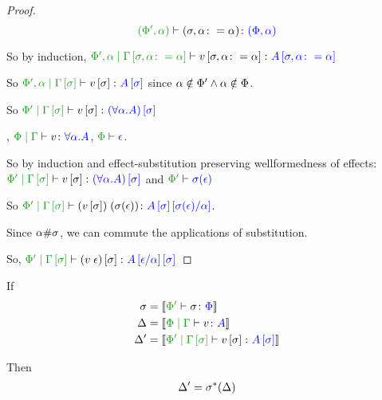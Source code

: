 \documentclass{report}
\begin{document}
\begin{framed}
\begin{proof}
    $$\typerelation{(\P',\a)}{(\si, \a\setto\a)}{(\P,\a)}$$
    
    So by induction, $\etyperelation{\P', \a}{\G\sub{\si, \a\setto\a}}{v\sub{\si,\a\setto\a}}{A\sub{\si, \a\setto\a}}$
    
    So $\etyperelation{\P',\a}{\G\ssi}{v\ssi}{A\ssi}$ since $\alpha\notin\Phi' \wedge\alpha\notin\Phi$.
    
    So $\etyperelation{\P'}{\G\ssi}{v\ssi}{(\all{\a}{A})\ssi}$
    
    \bi, $\gpetyperelation{v}{\all{\a}{A}}$, $\wellformed{\P}{\e}$.
    
    So by induction and effect-substitution preserving wellformedness of effects: $\etyperelation{\P'}{\G\ssi}{v\ssi}{(\all{\a}{A})\ssi}$ and $\wellformed{\P'}{\si(\e)}$
    
    So $\etyperelation{\P'}{\G\ssi}{\eapp{(v\ssi)}{(\si(\e))}}{A\ssi\ssub{\a}{\si(\e)}}$.
    
    Since $\alpha\#\sigma$, we can commute the applications of substitution. 
    
    So, $\etyperelation{\P'}{\G\ssi}{(\eapp{v}{\e})\ssi}{A\ssub{\a}{\e}\ssi}$
    
    \end{proof}
\end{framed}

\begin{theorem}
    
If 
\begin{align*}
    \si &= \deno{\typerelation{\P'}{\si}{\P}}\\
    \D &= \deno{\gpetyperelation{v}{A}}\\
    \D' &= \deno{\etyperelation{\P'}{\G\ssi}{v\ssi}{A\ssi}}\\
\end{align*}

Then \begin{eqnarray}
    \Delta' = \sigma^*(\Delta)
\end{eqnarray}
\end{theorem}
\end{document}
